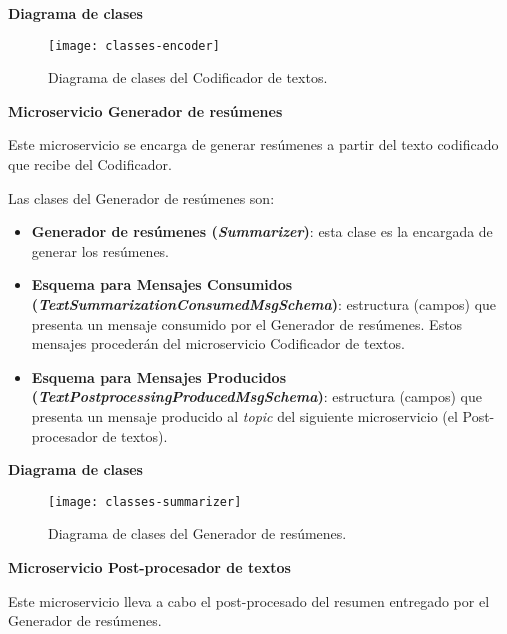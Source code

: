 \noindent
\textbf{Diagrama de clases}

\begin{figure}[h]
	\centering
	\texttt{[image: classes-encoder]}
	\vspace{-0.5cm}
	\caption{Diagrama de clases del Codificador de textos.}
\end{figure}

\newpage

\noindent
\textbf{\large Microservicio Generador de resúmenes}

Este microservicio se encarga de generar resúmenes a partir del texto codificado que recibe del Codificador.

Las clases del Generador de resúmenes son:

\vspace{-0.2cm}
\begin{itemize} [\textbullet]
	\item \textbf{Generador de resúmenes (\emph{Summarizer})}: esta clase es la encargada de generar los resúmenes.
	
	\item \textbf{Esquema para Mensajes Consumidos \\ (\emph{TextSummarizationConsumedMsgSchema})}: estructura (campos) que presenta un mensaje consumido por el Generador de resúmenes. Estos mensajes procederán del microservicio Codificador de textos.
	
	\item \textbf{Esquema para Mensajes Producidos \\ (\emph{TextPostprocessingProducedMsgSchema})}: estructura (campos) que presenta un mensaje producido al \emph{topic} del siguiente microservicio (el Post-procesador de textos).
\end{itemize}

\noindent
\textbf{Diagrama de clases}

\begin{figure}[h]
	\centering
	\texttt{[image: classes-summarizer]}
	\vspace{-0.5cm}
	\caption{Diagrama de clases del Generador de resúmenes.}
\end{figure}

\newpage

\noindent
\textbf{\large Microservicio Post-procesador de textos}

Este microservicio lleva a cabo el post-procesado del resumen entregado por el Generador de resúmenes.

